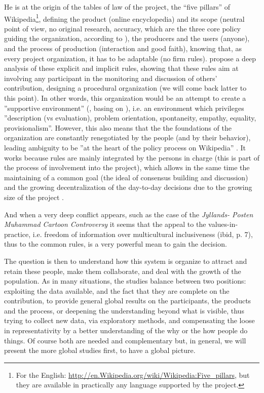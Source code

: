 He is at the origin of the tables of law of the project, the ``five
pillars'' of Wikipedia\footnote{For the English: \url{http://en.Wikipedia.org/wiki/Wikipedia:Five_pillars},
but they are available in practically any language supported by the
project.}, defining the product (online encyclopedia) and its scope (neutral
point of view, no original research, accuracy, which are the three
core policy guiding the organization, according to \citealp{Reagle10}),
the producers and the users (anyone), and the process of production
(interaction and good faith), knowing that, as every project organization,
it has to be adaptable (no firm rules). \citet{CardonLevrel09,Cardon12}
propose a deep analysis of these explicit and implicit rules, showing
that these rules aim at involving any participant in the monitoring
and discussion of others' contribution, designing a procedural organization
(we will come back latter to this point). In other words, this organization
would be an attempt to create a ''supportive environment'' (\citealt{Reagle10b},
basing on \citealp{Gibb61}), i.e. an environment which privileges
''description (vs evaluation), problem orientation, spontaneity,
empathy, equality, provisionalism''. However, this also means that
the the foundations of the organization are constantly renegotiated
by the people (and by their behavior), leading ambiguity to be ''at
the heart of the policy process on Wikipedia'' \citep{MateiDobrescu11}.
It works because rules are mainly integrated by the persons in charge
(this is part of the process of involvement into the project), which
allows in the same time the maintaining of a common goal (the ideal
of consensus building and discussion) and the growing decentralization
of the day-to-day decisions due to the growing size of the project
\citep{ForteLarcoBruckman09}.

And when a very deep conflict appears, such as the case of the \textit{Jyllands-
Posten Muhammad Cartoon Controversy} \citep{MorganMasonNahon11} it
seems that the appeal to the values-in-practice, i.e. freedom of information
over multicultural inclusiveness (ibid, p. 7), thus to the common
rules, is a very powerful mean to gain the decision.


The question is then to understand how this system is organize to
attract and retain these people, make them collaborate, and deal with
the growth of the population. As in many situations, the studies balance
between two positions: exploiting the data available, and the fact
that they are complete on the contribution, to provide general global
results on the participants, the products and the process, or deepening
the understanding beyond what is visible, thus trying to collect new
data, via exploratory methods, and compensating the loose in representativity
by a better understanding of the why or the how people do things.
Of course both are needed and complementary but, in general, we will
present the more global studies first, to have a global picture.